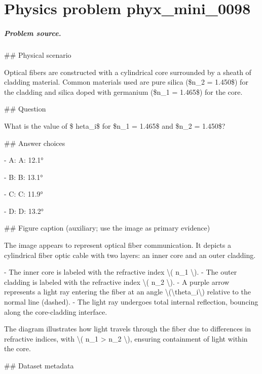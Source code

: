 
\chapter{Physics problem phyx\_mini\_0098}
\label{ch:PhyXMiniProblems_problem_phyx_mini_0098}

\paragraph{Problem source.}
\#\# Physical scenario

Optical fibers are constructed with a cylindrical core surrounded by a sheath of cladding material. Common materials used are pure silica (\$n\_2 = 1.450\$) for the cladding and silica doped with germanium (\$n\_1 = 1.465\$) for the core.

\#\# Question

What is the value of \$	heta\_i\$ for \$n\_1 = 1.465\$ and \$n\_2 = 1.450\$?

\#\# Answer choices

- A: A: 12.1°

- B: B: 13.1°

- C: C: 11.9°

- D: D: 13.2°

\#\# Figure caption (auxiliary; use the image as primary evidence)

The image appears to represent optical fiber communication. It depicts a cylindrical fiber optic cable with two layers: an inner core and an outer cladding. 

- The inner core is labeled with the refractive index \textbackslash{}( n\_1 \textbackslash{}).
- The outer cladding is labeled with the refractive index \textbackslash{}( n\_2 \textbackslash{}).
- A purple arrow represents a light ray entering the fiber at an angle \textbackslash{}(\textbackslash{}theta\_i\textbackslash{}) relative to the normal line (dashed).
- The light ray undergoes total internal reflection, bouncing along the core-cladding interface.

The diagram illustrates how light travels through the fiber due to differences in refractive indices, with \textbackslash{}( n\_1 > n\_2 \textbackslash{}), ensuring containment of light within the core.

\#\# Dataset metadata

